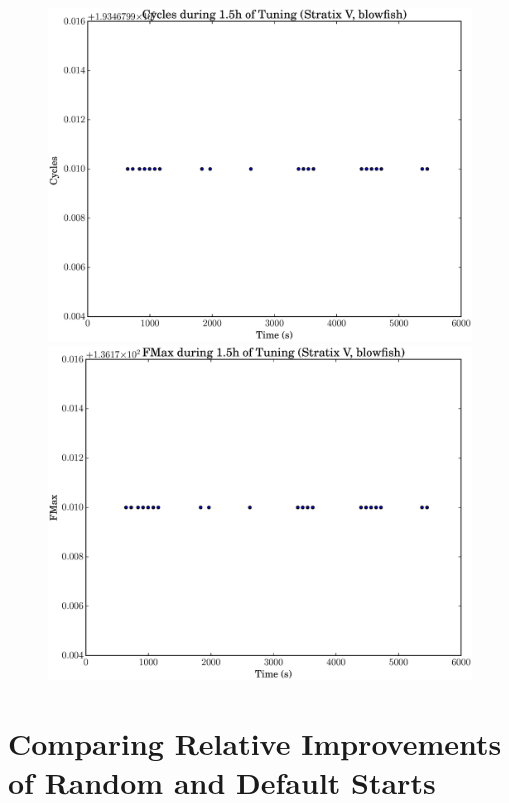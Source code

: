 \documentclass[12pt, a4paper]{article}
\begin{document}
\begin{figure}[htpb]
    \begin{minipage}{.48\textwidth}
        \includegraphics[scale=.25]{blowfish_cycles_5400_chstone_StratixV}
    \end{minipage}%
    \hfill
    \begin{minipage}{.48\textwidth}
        \includegraphics[scale=.25]{blowfish_fmax_5400_chstone_StratixV}
    \end{minipage}%
\end{figure}

\section{Comparing Relative Improvements of Random and Default Starts}
\end{document}
